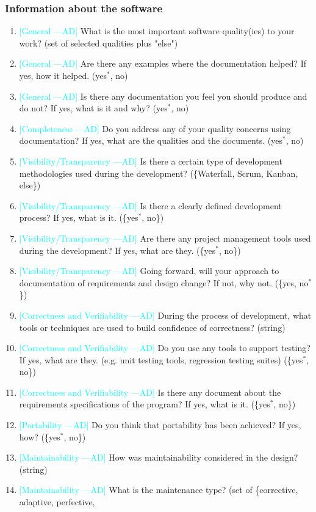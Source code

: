\documentclass[letterpaper,cleveref]{lipics-v2019}
\newcommand{\authornote}[3]{\textcolor{#1}{[#3 ---#2]}}
\newcommand{\authornote}[3]{}
\newcommand{\ad}[1]{\authornote{cyan}{AD}{#1}} %
\theoremstyle{definition}
\begin{document}
\subsubsection{Information about the software}

\begin{enumerate}
\item \ad{General} What is the most important software quality(ies) to your work? (set of selected qualities plus "else")
\item \ad{General} Are there any examples where the documentation helped? If yes, how it helped. ({yes$^*$, no})
\item \ad{General} Is there any documentation you feel you should produce and do not? If yes, what is it and why? ({yes$^*$, no})
\item \ad{Completeness} Do you address any of your quality concerns using documentation? If yes, what are the qualities and the documents. ({yes$^*$, no})
\item \ad{Visibility/Transparency} Is there a certain type of development methodologies used during the development? (\{Waterfall, Scrum, Kanban, else\})
\item \ad{Visibility/Transparency} Is there a clearly defined development process? If yes, what is it. (\{yes$^*$, no\})
\item \ad{Visibility/Transparency} Are there any project management tools used during the development? If yes, what are they. (\{yes$^*$, no\})
\item \ad{Visibility/Transparency} Going forward, will your approach to documentation of requirements and design
change? If not, why not. (\{yes, no$^*$\})
\item \ad{Correctness and Verifiability} During the process of development, what tools or techniques are used to build confidence of correctness? (string)
\item \ad{Correctness and Verifiability} Do you use any tools to support testing? If yes, what are they. (e.g. unit testing tools, regression testing suites) (\{yes$^*$, no\})
\item \ad{Correctness and Verifiability} Is there any document about the requirements specifications of the program? If yes, what is it. (\{yes$^*$, no\})
\item \ad{Portability} Do you think that portability has been achieved? If yes, how? (\{yes$^*$, no\})
\item \ad{Maintainability} How was maintainability considered in the design? (string)
\item \ad{Maintainability} What is the maintenance type? (set of \{corrective, adaptive, perfective,

\end{enumerate}
\end{document}
